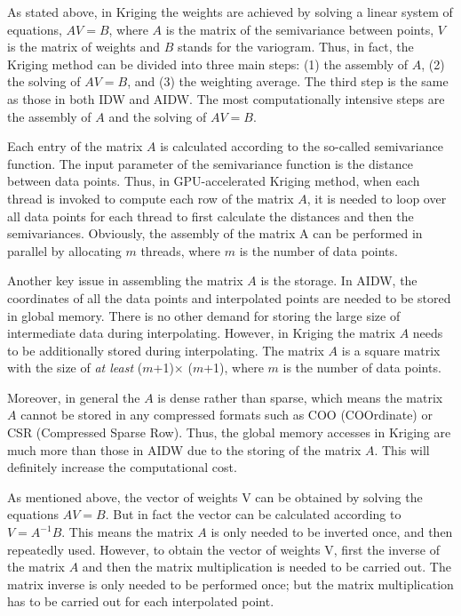 \documentclass[fleqn,11pt]{wlscirep}
\begin{document}
As stated above, in Kriging the weights are achieved by solving a linear 
system of equations, $AV = B$, where $A$ is the matrix of the semivariance 
between points, $V$ is the matrix of weights and $B$ stands for the variogram. 
Thus, in fact, the Kriging method can be divided into three main steps: (1) 
the assembly of $A$, (2) the solving of $AV = B$, and (3) the weighting average. 
The third step is the same as those in both IDW and AIDW. The most 
computationally intensive steps are the assembly of $A$ and the solving of $AV = B$.

Each entry of the matrix $A$ is calculated according to the so-called 
semivariance function. The input parameter of the semivariance function is 
the distance between data points. Thus, in GPU-accelerated Kriging method, 
when each thread is invoked to compute each row of the matrix $A$, it is 
needed to loop over all data points for each thread to first calculate the 
distances and then the semivariances. Obviously, the assembly of the matrix 
A can be performed in parallel by allocating $m$ threads, where $m$ is the number 
of data points.

Another key issue in assembling the matrix $A$ is the storage. In AIDW, the 
coordinates of all the data points and interpolated points are needed to be 
stored in global memory. There is no other demand for storing the large size 
of intermediate data during interpolating. However, in Kriging the matrix $A$ 
needs to be additionally stored during interpolating. The matrix $A$ is a 
square matrix with the size of \textit{at least} ($m$+1)$\times $ ($m$+1), where $m$ is the number of 
data points. 

Moreover, in general the $A$ is dense rather than sparse, which means the 
matrix $A$ cannot be stored in any compressed formats such as COO (COOrdinate) 
or CSR (Compressed Sparse Row). Thus, the global memory accesses in Kriging 
are much more than those in AIDW due to the storing of the matrix $A$. This 
will definitely increase the computational cost. 

As mentioned above, the vector of weights V can be obtained by solving the 
equations $AV = B$. But in fact the vector can be calculated according to 
$V=A^{-1}B$. This means the matrix $A$ is only needed to be inverted once, and 
then repeatedly used. However, to obtain the vector of weights V, first the 
inverse of the matrix $A$ and then the matrix multiplication is needed to be 
carried out. The matrix inverse is only needed to be performed once; but the 
matrix multiplication has to be carried out for each interpolated point.
\end{document}
